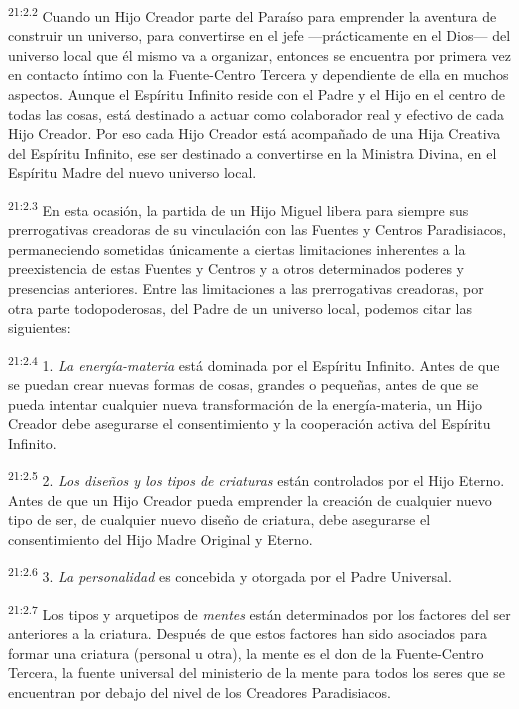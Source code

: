 \par
\textsuperscript{21:2.2} Cuando un Hijo Creador parte del Paraíso para emprender la aventura de construir un universo, para convertirse en el jefe ---prácticamente en el Dios--- del universo local que él mismo va a organizar, entonces se encuentra por primera vez en contacto íntimo con la Fuente-Centro Tercera y dependiente de ella en muchos aspectos. Aunque el Espíritu Infinito reside con el Padre y el Hijo en el centro de todas las cosas, está destinado a actuar como colaborador real y efectivo de cada Hijo Creador. Por eso cada Hijo Creador está acompañado de una Hija Creativa del Espíritu Infinito, ese ser destinado a convertirse en la Ministra Divina, en el Espíritu Madre del nuevo universo local.

\par
\textsuperscript{21:2.3} En esta ocasión, la partida de un Hijo Miguel libera para siempre sus prerrogativas creadoras de su vinculación con las Fuentes y Centros Paradisiacos, permaneciendo sometidas únicamente a ciertas limitaciones inherentes a la preexistencia de estas Fuentes y Centros y a otros determinados poderes y presencias anteriores. Entre las limitaciones a las prerrogativas creadoras, por otra parte todopoderosas, del Padre de un universo local, podemos citar las siguientes:

\par
\textsuperscript{21:2.4} 1. \textit{La energía-materia} está dominada por el Espíritu Infinito. Antes de que se puedan crear nuevas formas de cosas, grandes o pequeñas, antes de que se pueda intentar cualquier nueva transformación de la energía-materia, un Hijo Creador debe asegurarse el consentimiento y la cooperación activa del Espíritu Infinito.

\par
\textsuperscript{21:2.5} 2. \textit{Los diseños y los tipos de criaturas} están controlados por el Hijo Eterno. Antes de que un Hijo Creador pueda emprender la creación de cualquier nuevo tipo de ser, de cualquier nuevo diseño de criatura, debe asegurarse el consentimiento del Hijo Madre Original y Eterno.

\par
\textsuperscript{21:2.6} 3. \textit{La personalidad} es concebida y otorgada por el Padre Universal.

\par
\textsuperscript{21:2.7} Los tipos y arquetipos de \textit{mentes} están determinados por los factores del ser anteriores a la criatura. Después de que estos factores han sido asociados para formar una criatura (personal u otra), la mente es el don de la Fuente-Centro Tercera, la fuente universal del ministerio de la mente para todos los seres que se encuentran por debajo del nivel de los Creadores Paradisiacos.

